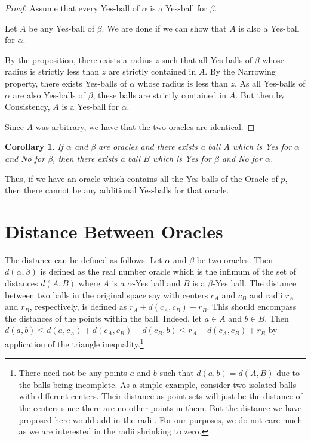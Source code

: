 \documentclass[12pt]{article}
\newtheorem{corollary}{Corollary}[section]
\begin{document}
\begin{proof}
    Assume that every Yes-ball of $\alpha$ is a Yes-ball for $\beta$.

    Let $A$ be any Yes-ball of $\beta$. We are done if we can show that $A$ is also a Yes-ball for $\alpha$.
    
    By the proposition, there exists a radius $z$ such that all Yes-balls of $\beta$ whose radius is strictly less than $z$ are strictly contained in $A$. By the Narrowing property, there exists Yes-balls of $\alpha$ whose radius is less than $z$. As all Yes-balls of $\alpha$ are also Yes-balls of $\beta$, these balls are strictly contained in $A$. But then by Consistency, $A$ is a Yes-ball for $\alpha$.

    Since $A$ was arbitrary, we have that the two oracles are identical. 
    
\end{proof}

\begin{corollary}\label{cor:yesno}
    If $\alpha$ and $\beta$ are oracles and there exists a ball $A$ which is Yes for $\alpha$ and No for $\beta$, then there exists a ball $B$ which is Yes for $\beta$ and No for $\alpha$. 
\end{corollary}

Thus, if we have an oracle which contains all the Yes-balls of the Oracle of $p$, then there cannot be any additional Yes-balls for that oracle. 



\section{Distance Between Oracles}

The distance can be defined as follows. Let $\alpha$ and $\beta$ be two oracles. Then $\underline{d}(\alpha,\beta)$ is defined as the real number oracle which is the infimum of the set of distances $d(A, B)$ where $A$ is a $\alpha$-Yes ball and $B$ is a $\beta$-Yes ball. The distance between two balls in the original space say with centers $c_A$ and $c_B$ and radii $r_A$ and $r_B$, respectively, is defined as $r_A + d(c_A,c_B) + r_B$. This should encompass the distances of the points within the ball. Indeed, let $a \in A$ and $b\in B$. Then $d(a, b) \leq d(a,c_A) + d(c_A,c_B) + d(c_B,b) \leq r_A + d(c_A,c_B) + r_B$ by application of the triangle inequality.\footnote{There need not be any points $a$ and $b$ such that $d(a,b) = d(A, B)$ due to the balls being incomplete. As a simple example, consider two isolated balls with different centers. Their distance as point sets will just be the distance of the centers since there are no other points in them. But the distance we have proposed here would add in the radii. For our purposes, we do not care much as we are interested in the radii shrinking to zero. } 
\end{document}
